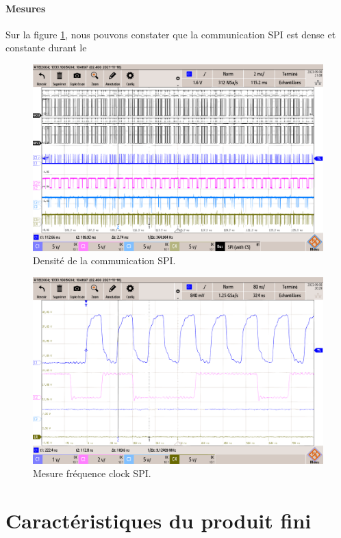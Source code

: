 \clearpage

\paragraph{Mesures} Sur la figure \ref{fig:densite-comm}, nous pouvons constater que la communication SPI est dense et constante durant le 

\begin{figure}[H]
	\centering
	\includegraphics[width=0.7\linewidth]{../figures/mesures/SPI/densite-comm}
	\caption{Densité de la communication SPI.}
	\label{fig:densite-comm}
\end{figure}

\begin{figure}[H]
	\centering
	\includegraphics[width=0.7\linewidth]{../figures/mesures/SPI/freq-spi}
	\caption{Mesure fréquence clock SPI.}
	\label{fig:freq-spi}
\end{figure}





\section{Caractéristiques du produit fini} \label{sec:Carac-finis}